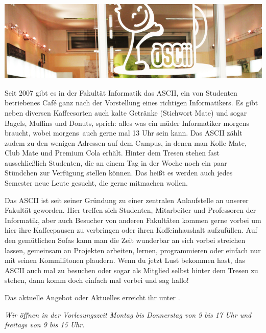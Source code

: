 
\includegraphics[width=\linewidth]{img/ascii.jpg}

Seit 2007 gibt es in der Fakultät Informatik das ASCII, ein von Studenten betriebenes Café ganz nach der Vorstellung eines richtigen Informatikers.
Es gibt neben diversen Kaffeesorten auch kalte Getränke (Stichwort Mate) und sogar Bagels, Muffins und Donuts, sprich:
alles was ein müder Informatiker morgens braucht, wobei \glqq morgens\grqq\ auch gerne mal 13 Uhr sein kann.
Das ASCII zählt zudem zu den wenigen Adressen auf dem Campus, in denen man Kolle Mate, Club Mate und Premium Cola erhält.
Hinter dem Tresen stehen fast ausschließlich Studenten, die an einem Tag in der Woche noch ein paar Stündchen zur Verfügung stellen können.
Das heißt es werden auch jedes Semester neue Leute gesucht, die gerne mitmachen wollen.

Das ASCII ist seit seiner Gründung zu einer zentralen Anlaufstelle an unserer Fakultät geworden.
Hier treffen sich Studenten, Mitarbeiter und Professoren der Informatik, aber auch Besucher von anderen Fakultäten kommen gerne vorbei um hier ihre Kaffeepausen zu verbringen oder ihren Koffeinhaushalt aufzufüllen.
Auf den gemütlichen Sofas kann man die Zeit wunderbar an sich vorbei streichen lassen, gemeinsam an Projekten arbeiten, lernen, programmieren oder einfach nur mit seinen Kommilitonen plaudern.
Wenn du jetzt Lust bekommen hast, das ASCII auch mal zu besuchen oder sogar als Mitglied selbst hinter dem Tresen zu stehen, dann komm doch einfach mal vorbei und sag hallo!

Das aktuelle Angebot oder Aktuelles erreicht ihr unter .

\textit{Wir öffnen in der Vorlesungszeit Montag bis Donnerstag von 9 bis 17 Uhr und freitags von 9 bis 15 Uhr.}
